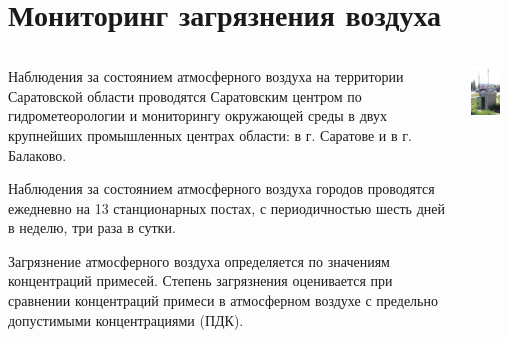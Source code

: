 \section{Мониторинг загрязнения воздуха}
\begin{frame}{\insertsectionhead}
    \begin{columns}[c]
        \begin{column}{.55\linewidth}
        \footnotesize
        Наблюдения за состоянием атмосферного воздуха на территории Саратовской области проводятся 
        Саратовским центром по гидрометеорологии и мониторингу окружающей среды
        в двух крупнейших промышленных центрах области: в г. Саратове и в г. Балаково.
        \smallskip

        Наблюдения за состоянием атмосферного воздуха городов проводятся ежедневно на 13 станционарных постах, 
        с периодичностью шесть дней в неделю, три раза в сутки.
        
        \smallskip
        Загрязнение атмосферного воздуха определяется по значениям концентраций примесей. 
        Степень загрязнения оценивается при сравнении концентраций примеси в атмосферном 
        воздухе с предельно допустимыми концентрациями (ПДК). 
        \end{column}

        \begin{column}{.42\linewidth}
            \includegraphics[width=0.7\textwidth]{assets/pnz.png}
        \end{column}
    \end{columns}
\end{frame}
